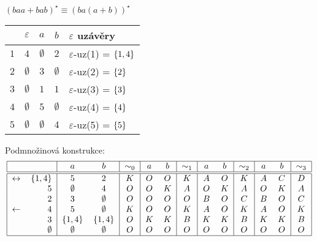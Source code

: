 \begin{multicols}{2}
    $(baa + bab)^\star \equiv (ba(a+b))^\star$


\columnbreak

    \begin{tabular}{|r|c c c|l|}
        \hline
        & $\varepsilon$ & $a$ & $b$ & $\varepsilon$ uzávěry\\
        \hline
        \hline
        $1$ & $4$ & $\emptyset$ & $2$         & $\varepsilon$-uz(1) = $\left\lbrace 1,4 \right\rbrace$\\
        $2$ & $\emptyset$ & $3$ & $\emptyset$ & $\varepsilon$-uz(2) = $\left\lbrace 2 \right\rbrace$\\
        $3$ & $\emptyset$ & $1$ & $1$         & $\varepsilon$-uz(3) = $\left\lbrace 3 \right\rbrace$\\
        $4$ & $\emptyset$ & $5$ & $\emptyset$ & $\varepsilon$-uz(4) = $\left\lbrace 4 \right\rbrace$\\
        $5$ & $\emptyset$ & $\emptyset$ & $4$ & $\varepsilon$-uz(5) = $\left\lbrace 5 \right\rbrace$\\
        \hline
    \end{tabular}
\end{multicols}
Podmnožinová konstrukce:
\[
\begin{tabular}{|r r|c c|c|c c|c|c c|c|c c|c|}
    \hline
    & & $a$ & $b$ & $\sim_0$ & $a$ & $b$ & $\sim_1$ & $a$ & $b$ & $\sim_2$ & $a$ & $b$ & $\sim_3$ \\ \hline \hline
    $\leftrightarrow$& $\bc{1,4}$&$5$         &$2$         &$K$ &$O$ &$O$ &$K$ &$A$ &$O$ &$K$ &$A$ &$C$ &$D$ \\
    $$&             $5$          &$\emptyset$ &$4$         &$O$ &$O$ &$K$ &$A$ &$O$ &$K$ &$A$ &$O$ &$K$ &$A$ \\
    $$&             $2$          &$3$         &$\emptyset$ &$O$ &$O$ &$O$ &$O$ &$B$ &$O$ &$C$ &$B$ &$O$ &$C$ \\
    $\leftarrow $&  $4$          &$5$         &$\emptyset$ &$K$ &$O$ &$O$ &$K$ &$A$ &$O$ &$K$ &$A$ &$O$ &$K$ \\
    $$&             $3$          &$\bc{1,4}$  &$\bc{1,4}$  &$O$ &$K$ &$K$ &$B$ &$K$ &$K$ &$B$ &$K$ &$K$ &$B$ \\
    $$&             $\emptyset$  &$\emptyset$ &$\emptyset$ &$O$ &$O$ &$O$ &$O$ &$O$ &$O$ &$O$ &$O$ &$O$ &$O$ \\
    \hline
\end{tabular}
\]
